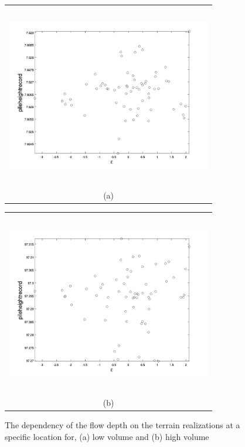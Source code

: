 \documentclass[a4paper,fleqn]{article}
\begin{document}
\begin{figure}[H]
    \begin{minipage}[b]{0.6\textwidth}
        \begin{tabular}{c}
        \includegraphics[width=9cm,height=8cm,keepaspectratio]{eps_vs_pile_low_vol.jpg}\\
        (a)
        \end{tabular}
    \end{minipage}
    \begin{minipage}{0.6\textwidth}
        \begin{tabular}{c}
        \includegraphics[width=9cm,height=8cm,keepaspectratio]{eps_vs_pile_high_vol.jpg}\\
        (b)
        \end{tabular}
    \end{minipage} 
\caption{The dependency of the flow depth on the terrain realizations at a specific location for, (a) low volume and (b) high volume}
\label{fig4}  
\end{figure}
\end{document}
